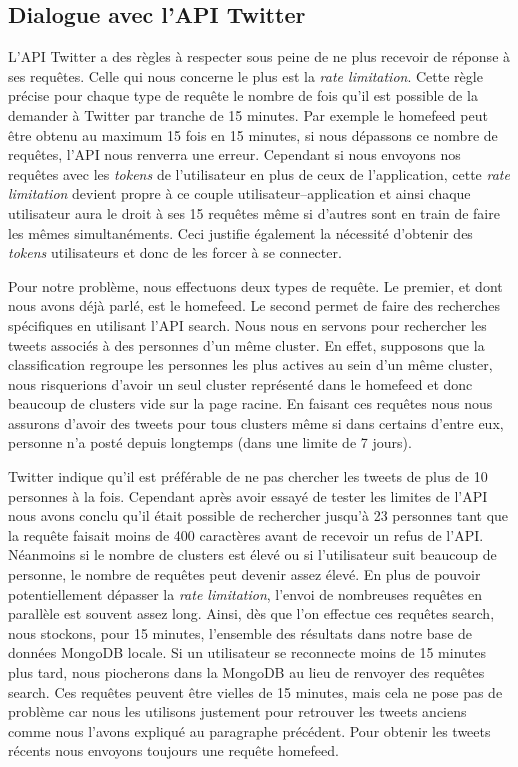 \documentclass[a4paper]{article}
\begin{document}
\subsection{Dialogue avec l'API Twitter}
L'API Twitter a des règles à respecter sous peine de ne plus recevoir de réponse à ses requêtes. Celle qui nous concerne le plus est la \emph{rate limitation}. Cette règle précise pour chaque type de requête le nombre de fois qu'il est possible de la demander à Twitter par tranche de 15 minutes. Par exemple le homefeed peut être obtenu au maximum 15 fois en 15 minutes, si nous dépassons ce nombre de requêtes, l'API nous renverra une erreur. Cependant si nous envoyons nos requêtes avec les \emph{tokens} de l'utilisateur en plus de ceux de l'application, cette \emph{rate limitation} devient propre à ce couple utilisateur--application et ainsi chaque utilisateur aura le droit à ses 15 requêtes même si d'autres sont en train de faire les mêmes simultanéments. Ceci justifie également la nécessité d'obtenir des \emph{tokens} utilisateurs et donc de les forcer à se connecter.

Pour notre problème, nous effectuons deux types de requête. Le premier, et dont nous avons déjà parlé, est le homefeed. Le second permet de faire des recherches spécifiques en utilisant l'API search. Nous nous en servons pour rechercher les tweets associés à des personnes d'un même cluster. En effet, supposons que la classification regroupe les personnes les plus actives au sein d'un même cluster, nous risquerions d'avoir un seul cluster représenté dans le homefeed et donc beaucoup de clusters vide sur la page racine. En faisant ces requêtes nous nous assurons d'avoir des tweets pour tous clusters même si dans certains d'entre eux, personne n'a posté depuis longtemps (dans une limite de 7 jours).

Twitter indique qu'il est préférable de ne pas chercher les tweets de plus de 10 personnes à la fois. Cependant après avoir essayé de tester les limites de l'API nous avons conclu qu'il était possible de rechercher jusqu'à 23 personnes tant que la requête faisait moins de 400 caractères avant de recevoir un refus de l'API. Néanmoins si le nombre de clusters est élevé ou si l'utilisateur suit beaucoup de personne, le nombre de requêtes peut devenir assez élevé. En plus de pouvoir potentiellement dépasser la \emph{rate limitation}, l'envoi de nombreuses requêtes en parallèle est souvent assez long. Ainsi, dès que l'on effectue ces requêtes search, nous stockons, pour 15 minutes, l'ensemble des résultats dans notre base de données MongoDB locale. Si un utilisateur se reconnecte moins de 15 minutes plus tard, nous piocherons dans la MongoDB au lieu de renvoyer des requêtes search. Ces requêtes peuvent être vielles de 15 minutes, mais cela ne pose pas de problème car nous les utilisons justement pour retrouver les tweets anciens comme nous l'avons expliqué au paragraphe précédent. Pour obtenir les tweets récents nous envoyons toujours une requête homefeed. 
\end{document}
